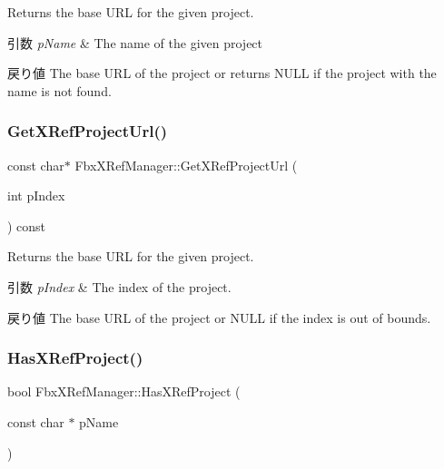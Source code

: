 Returns the base U\+RL for the given project. 
\begin{DoxyParams}{引数}
{\em p\+Name} & The name of the given project \\
\hline
\end{DoxyParams}
\begin{DoxyReturn}{戻り値}
The base U\+RL of the project or returns N\+U\+LL if the project with the name is not found. 
\end{DoxyReturn}
\mbox{\label{class_fbx_x_ref_manager_ab8f651bb9163d1c7ba56586c0c879c07}} 
\subsubsection{\texorpdfstring{Get\+X\+Ref\+Project\+Url()}{GetXRefProjectUrl()}\hspace{0.1cm}{\footnotesize\ttfamily [3/3]}}
{\footnotesize\ttfamily const char$\ast$ Fbx\+X\+Ref\+Manager\+::\+Get\+X\+Ref\+Project\+Url (\begin{DoxyParamCaption}\item[{int}]{p\+Index }\end{DoxyParamCaption}) const}

Returns the base U\+RL for the given project. 
\begin{DoxyParams}{引数}
{\em p\+Index} & The index of the project. \\
\hline
\end{DoxyParams}
\begin{DoxyReturn}{戻り値}
The base U\+RL of the project or N\+U\+LL if the index is out of bounds. 
\end{DoxyReturn}
\mbox{\label{class_fbx_x_ref_manager_afa24aa1ef0d54bf0288947f9e005ec7c}} 
\subsubsection{\texorpdfstring{Has\+X\+Ref\+Project()}{HasXRefProject()}}
{\footnotesize\ttfamily bool Fbx\+X\+Ref\+Manager\+::\+Has\+X\+Ref\+Project (\begin{DoxyParamCaption}\item[{const char $\ast$}]{p\+Name }\end{DoxyParamCaption})}

